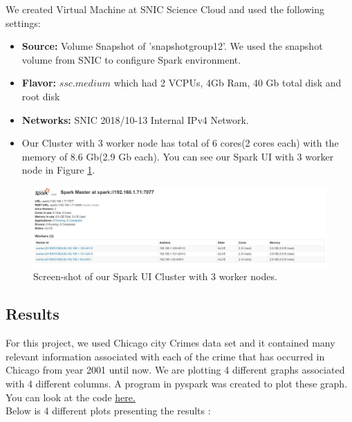 We created Virtual Machine at SNIC Science Cloud \cite{snic} and used the following settings:

\begin{itemize}
    \item \textbf{Source:} Volume Snapshot of 'snapshotgroup12'. We used the snapshot volume from SNIC to configure Spark environment.
    \item \textbf{Flavor:} $ssc.medium$ which had 2 VCPUs, 4Gb Ram, 40 Gb total disk and root disk
    \item \textbf{Networks:} SNIC 2018/10-13 Internal IPv4 Network.
    \item Our Cluster with 3 worker node has total of 6 cores(2 cores each) with the memory of 8.6 Gb(2.9 Gb each). You can see our Spark UI with 3 worker node in Figure \ref{fig:spark_master_three}. 
\end{itemize}

\begin{figure}[H]
    \centering
    \includegraphics[width=.95\linewidth]{figures/spark_master_three.jpg}
    \caption{Screen-shot of our Spark UI Cluster with 3 worker nodes.}
    \label{fig:spark_master_three}
\end{figure}


\subsection{Results}
For this project, we used Chicago city Crimes data set\cite{cityOfChicago} and it contained many relevant information associated with each of the crime that has occurred in Chicago from year 2001 until now. We are plotting 4 different graphs associated with 4 different columns. A program in pyspark was created to plot these graph. You can look at the code \href{https://github.com/ankurshukla03/ldsaproject/blob/edit_report/code/Crimes.ipynb}{here.} \\
Below is 4 different plots presenting the results :\\


